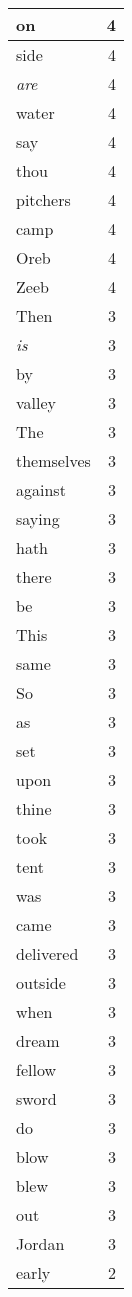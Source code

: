 \begin{center}
\begin{longtable}{l|r}
on & 4\\ \hline 
side & 4\\ \hline 
\emph{are} & 4\\ \hline 
water & 4\\ \hline 
say & 4\\ \hline 
thou & 4\\ \hline 
pitchers & 4\\ \hline 
camp & 4\\ \hline 
Oreb & 4\\ \hline 
Zeeb & 4\\ \hline 
Then & 3\\ \hline 
\emph{is} & 3\\ \hline 
by & 3\\ \hline 
valley & 3\\ \hline 
The & 3\\ \hline 
themselves & 3\\ \hline 
against & 3\\ \hline 
saying & 3\\ \hline 
hath & 3\\ \hline 
there & 3\\ \hline 
be & 3\\ \hline 
This & 3\\ \hline 
same & 3\\ \hline 
So & 3\\ \hline 
as & 3\\ \hline 
set & 3\\ \hline 
upon & 3\\ \hline 
thine & 3\\ \hline 
took & 3\\ \hline 
tent & 3\\ \hline 
was & 3\\ \hline 
came & 3\\ \hline 
delivered & 3\\ \hline 
outside & 3\\ \hline 
when & 3\\ \hline 
dream & 3\\ \hline 
fellow & 3\\ \hline 
sword & 3\\ \hline 
do & 3\\ \hline 
blow & 3\\ \hline 
blew & 3\\ \hline 
out & 3\\ \hline 
Jordan & 3\\ \hline 
early & 2\\ \hline 

\end{longtable}
\end{center}
